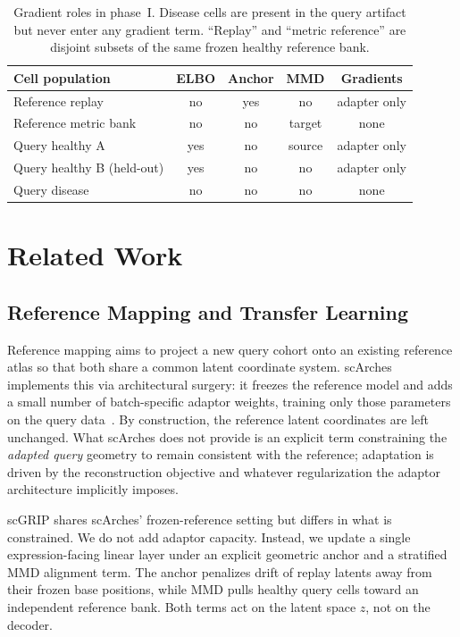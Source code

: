 \documentclass[12pt, a4paper]{article}
\begin{document}
\begin{table}[H]
\centering
\caption{Gradient roles in phase~I. Disease cells are present in the query
artifact but never enter any gradient term. ``Replay'' and ``metric
reference'' are disjoint subsets of the same frozen healthy reference bank.}
\label{tab:roles}
\begin{tabular}{lcccc}
\toprule
Cell population & ELBO & Anchor & MMD & Gradients \\
\midrule
Reference replay              & no  & yes & no     & adapter only \\
Reference metric bank         & no  & no  & target & none \\
Query healthy A               & yes & no  & source & adapter only \\
Query healthy B (held-out)    & yes & no  & no     & adapter only \\
Query disease                 & no  & no  & no     & none \\
\bottomrule
\end{tabular}
\end{table}

\section{Related Work}
\label{sec:related}

\subsection{Reference Mapping and Transfer Learning}

Reference mapping aims to project a new query cohort onto an existing reference atlas so that both share a common latent coordinate system. scArches implements this via architectural surgery: it freezes the reference model and adds a small number of batch-specific adaptor weights, training only those parameters on the query data~\cite{scarches_2022}. By construction, the reference latent coordinates are left unchanged. What scArches does not provide is an explicit term constraining the \emph{adapted query} geometry to remain consistent with the reference; adaptation is driven by the reconstruction objective and whatever regularization the adaptor architecture implicitly imposes.

scGRIP shares scArches' frozen-reference setting but differs in what is constrained. We do not add adaptor capacity. Instead, we update a single expression-facing linear layer under an explicit geometric anchor and a stratified MMD alignment term. The anchor penalizes drift of replay latents away from their frozen base positions, while MMD pulls healthy query cells toward an independent reference bank. Both terms act on the latent space \(z\), not on the decoder.
\end{document}

